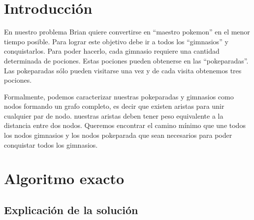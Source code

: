 \documentclass[spanish,12pt]{article}
\begin{document}
\author{Grupo  \\Alvarez Vico Jazm\'in\\Cortés Conde Titó Javier María\\Pedraza Marcelo \\ Rozenberg Uriel Jonathan}


\maketitle


\clearpage

\tableofcontents
\cleardoublepage


\section{Introducción}
En nuestro problema Brian quiere convertirse en ``maestro pokemon'' en el menor tiempo posible. Para lograr este objetivo debe ir a todos los ``gimnasios'' y conquistarlos. Para poder hacerlo, cada gimnasio requiere una cantidad determinada de pociones. Estas pociones pueden obtenerse en las ``pokeparadas''. Las pokeparadas sólo pueden visitarse una vez y de cada visita obtenemos tres pociones.

Formalmente, podemos caracterizar nuestras pokeparadas y  gimnasios como nodos formando un grafo completo, es decir que existen aristas para unir cualquier par de nodo. nuestras aristas deben tener peso equivalente a la distancia entre dos nodos. Queremos encontrar el camino mínimo que une todos los nodos gimnasios y los nodos pokeparada que sean necesarios para poder conquistar todos los gimnasios. 


\section{Algoritmo exacto}

\subsection{Explicación de la solución}
\end{document}
